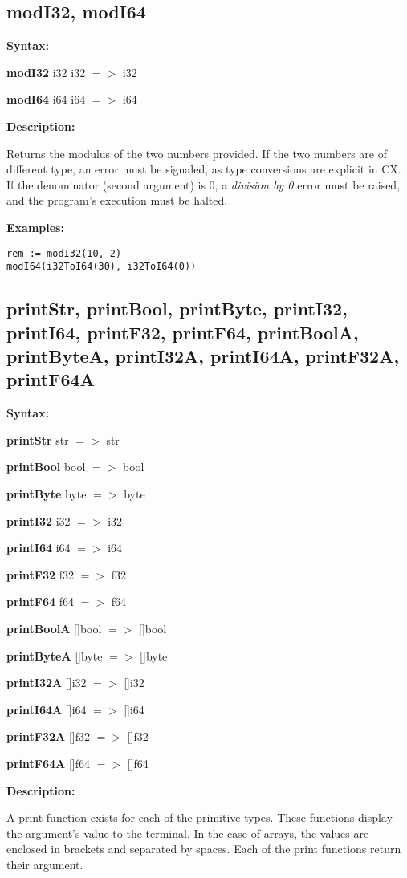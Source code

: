 \subsection{modI32, modI64}

\textbf{Syntax:}

\textbf{modI32} i32 i32 $=>$ i32

\textbf{modI64} i64 i64 $=>$ i64

\textbf{Description:}

Returns the modulus of the two numbers provided. If the two numbers
are of different type, an error must be signaled, as type conversions
are explicit in CX. If the denominator (second argument) is 0, a
\textit{division by 0} error must be raised, and the program's
execution must be halted.

\textbf{Examples:}

\begin{lstlisting}
rem := modI32(10, 2)
modI64(i32ToI64(30), i32ToI64(0))
\end{lstlisting}

\subsection{printStr, printBool, printByte, printI32, printI64, printF32,
  printF64, printBoolA, printByteA, printI32A, printI64A, printF32A, printF64A}

\textbf{Syntax:}

\textbf{printStr} str $=>$ str

\textbf{printBool} bool $=>$ bool

\textbf{printByte} byte $=>$ byte

\textbf{printI32} i32 $=>$ i32

\textbf{printI64} i64 $=>$ i64

\textbf{printF32} f32 $=>$ f32

\textbf{printF64} f64 $=>$ f64

\textbf{printBoolA} []bool $=>$ []bool

\textbf{printByteA} []byte $=>$ []byte

\textbf{printI32A} []i32 $=>$ []i32

\textbf{printI64A} []i64 $=>$ []i64

\textbf{printF32A} []f32 $=>$ []f32

\textbf{printF64A} []f64 $=>$ []f64

\textbf{Description:}

A print function exists for each of the primitive types. These
functions display the argument's value to the terminal. In the case of
arrays, the values are enclosed in brackets and separated by
spaces. Each of the print functions return their argument.

